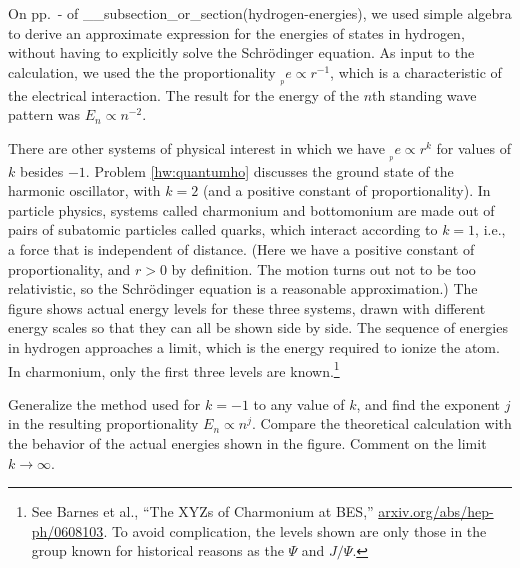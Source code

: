 On pp.~\pageref{start-approx-hydrogen-energies}-\pageref{end-approx-hydrogen-energies}
of __subsection_or_section(hydrogen-energies), we used simple algebra to derive
an approximate expression for the energies of states in hydrogen, without having to
explicitly solve the Schr\"odinger equation.
As input to the calculation, we used the the proportionality $__pe \propto r^{-1}$,
which is a characteristic of the electrical interaction. The result for the
energy of the $n$th standing wave pattern was $E_n \propto n^{-2}$.

There are other systems of physical interest in which we have
$__pe \propto r^k$ for values of $k$ besides $-1$. Problem
\ref{hw:quantumho} discusses the ground state of the harmonic oscillator,
with $k=2$ (and a positive constant of proportionality). In particle physics,
systems called charmonium and bottomonium are made out of pairs of subatomic
particles called quarks, which interact according to $k=1$, i.e., a force that
is independent of distance. (Here we have a positive
constant of proportionality, and $r>0$ by definition.
The motion turns out not to be too relativistic, so 
the Schr\"odinger equation is a reasonable approximation.)
The figure shows actual energy levels for these three systems, drawn with
different energy scales so that they can all be shown side by side.
The sequence of energies in hydrogen approaches a limit, which is the energy
required to ionize the atom. In charmonium, only the first three levels are known.\footnote{See
Barnes et al., ``The XYZs of Charmonium at BES,'' \url{arxiv.org/abs/hep-ph/0608103}. To avoid complication,
the levels shown are only those in the group known for historical reasons as the $\Psi$ and $J/\Psi$.}

Generalize the method used for $k=-1$ to any value of $k$, and find the
exponent $j$ in the resulting proportionality $E_n \propto n^j$.
Compare the theoretical calculation with the behavior of the actual energies shown in the figure.
Comment on the limit $k\rightarrow\infty$.
\answercheck
